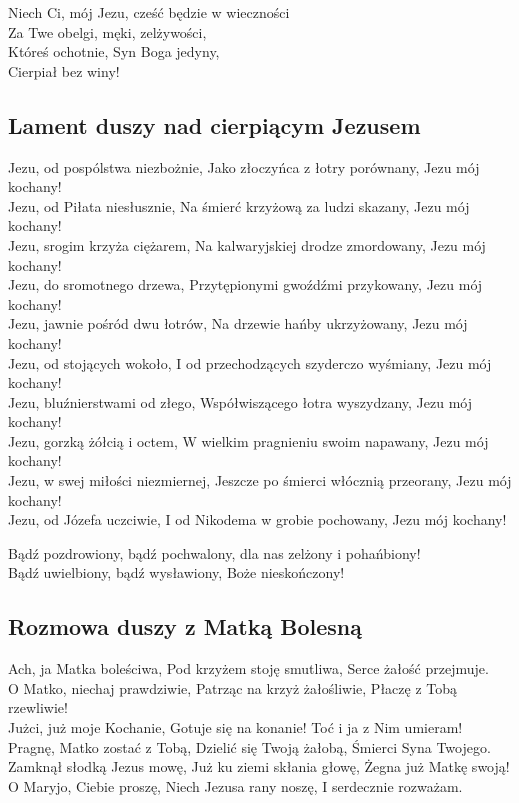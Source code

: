 Niech Ci, mój Jezu, cześć będzie w wieczności\\
Za Twe obelgi, męki, zelżywości,\\
Któreś ochotnie, Syn Boga jedyny,\\
Cierpiał bez winy!


\subsection{Lament duszy nad cierpiącym Jezusem}

Jezu, od pospólstwa niezbożnie, Jako złoczyńca z łotry porównany, Jezu
mój kochany!\\
Jezu, od Piłata niesłusznie, Na śmierć krzyżową za ludzi skazany, Jezu
mój kochany!\\
Jezu, srogim krzyża ciężarem, Na kalwaryjskiej drodze zmordowany, Jezu
mój kochany!\\
Jezu, do sromotnego drzewa, Przytępionymi gwoźdźmi przykowany, Jezu mój
kochany!\\
Jezu, jawnie pośród dwu łotrów, Na drzewie hańby ukrzyżowany, Jezu mój
kochany!\\
Jezu, od stojących wokoło, I od przechodzących szyderczo wyśmiany, Jezu
mój kochany!\\
Jezu, bluźnierstwami od złego, Współwiszącego łotra wyszydzany, Jezu mój
kochany!\\
Jezu, gorzką żółcią i octem, W wielkim pragnieniu swoim napawany, Jezu
mój kochany!\\
Jezu, w swej miłości niezmiernej, Jeszcze po śmierci włócznią przeorany,
Jezu mój kochany!\\
Jezu, od Józefa uczciwie, I od Nikodema w grobie pochowany, Jezu mój
kochany!

Bądź pozdrowiony, bądź pochwalony, dla nas zelżony i pohańbiony!\\
Bądź uwielbiony, bądź wysławiony, Boże nieskończony!


\subsection{Rozmowa duszy z Matką Bolesną}

Ach, ja Matka boleściwa, Pod krzyżem stoję smutliwa, Serce żałość
przejmuje.\\
O Matko, niechaj prawdziwie, Patrząc na krzyż żałośliwie, Płaczę z Tobą
rzewliwie!\\
Jużci, już moje Kochanie, Gotuje się na konanie! Toć i ja z Nim
umieram!\\
Pragnę, Matko zostać z Tobą, Dzielić się Twoją żałobą, Śmierci Syna
Twojego.\\
Zamknął słodką Jezus mowę, Już ku ziemi skłania głowę, Żegna już Matkę
swoją!\\
O Maryjo, Ciebie proszę, Niech Jezusa rany noszę, I serdecznie rozważam.




